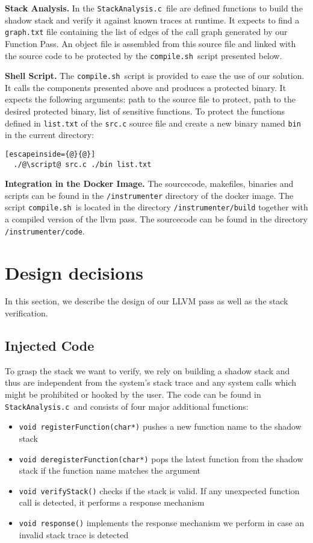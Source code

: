 \documentclass{llncs}
\newcommand{\stacka}{\texttt{StackAnalysis.c }}
\newcommand{\script}{\texttt{compile.sh }}
\begin{document}
\noindent\textbf{Stack Analysis.}\newline
In the \stacka file are defined functions to build the shadow stack and verify it against known traces at runtime. It expects to find a \texttt{graph.txt} file containing the list of edges of the call graph generated by our Function Pass. An object file is assembled from this source file and linked with the source code to be protected by the \script script presented below.\newline

\noindent\textbf{Shell Script.}\newline
The \script script is provided to ease the use of our solution. It calls the components presented above and produces a protected binary. It expects the following arguments: path to the source file to protect, path to the desired protected binary, list of sensitive functions. To protect the functions defined in \texttt{list.txt} of the \texttt{src.c} source file and create a new binary named \texttt{bin} in the current directory:
\begin{lstlisting}[escapeinside={@}{@}]
  ./@\script@ src.c ./bin list.txt
\end{lstlisting}

\noindent\textbf{Integration in the Docker Image.}\newline
The sourcecode, makefiles, binaries and scripts can be found in the \texttt{/instrumenter} directory of the docker image. The script \script is located in the directory \texttt{/instrumenter/build} together with a compiled version of the llvm pass. The sourcecode can be found in the directory \texttt{/instrumenter/code}.
\newpage

\section{Design decisions}
In this section, we describe the design of our LLVM pass as well as the stack verification.

\subsection{Injected Code}
To grasp the stack we want to verify, we rely on building a shadow stack and thus are independent from the system's stack trace and any system calls which might be prohibited or hooked by the user. The code can be found in \stacka and consists of four major additional functions:
\begin{itemize}
\item \texttt{void registerFunction(char*)} pushes a new function name to the shadow stack
\item \texttt{void deregisterFunction(char*)} pops the latest function from the shadow stack if the function name matches the argument
\item \texttt{void verifyStack()} checks if the stack is valid. If any unexpected function call is detected, it performs a response mechanism
\item \texttt{void response()} implements the response mechanism we perform in case an invalid stack trace is detected
\end{itemize}
\end{document}
